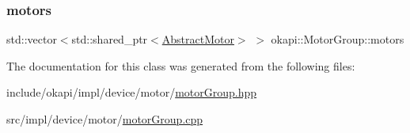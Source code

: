 \subsubsection{\texorpdfstring{motors}{motors}}
{\footnotesize\ttfamily std\+::vector$<$std\+::shared\+\_\+ptr$<$\mbox{\hyperlink{classokapi_1_1AbstractMotor}{Abstract\+Motor}}$>$ $>$ okapi\+::\+Motor\+Group\+::motors\hspace{0.3cm}{\ttfamily [protected]}}



The documentation for this class was generated from the following files\+:\begin{DoxyCompactItemize}
\item 
include/okapi/impl/device/motor/\mbox{\hyperlink{motorGroup_8hpp}{motor\+Group.\+hpp}}\item 
src/impl/device/motor/\mbox{\hyperlink{motorGroup_8cpp}{motor\+Group.\+cpp}}\end{DoxyCompactItemize}
